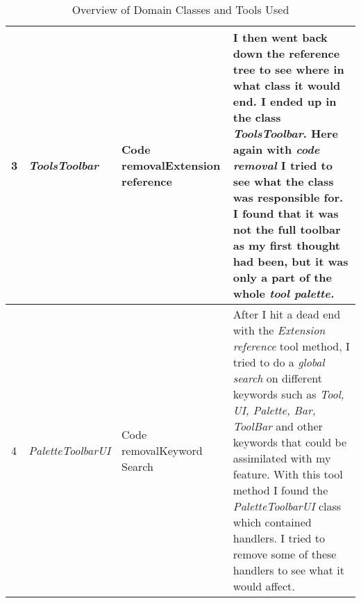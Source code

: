 \begin{table}[ht]
\begin{tabular}{|p{0.5cm}|p{3.5cm}|p{3.5cm}|p{8cm}|}
        3           & \textit{ToolsToolbar}       & Code removal\newline Extension reference                          & I then went back down the reference tree to see where in what class it would end. I ended up in the class \textit{ToolsToolbar}. Here again with \textit{code removal} I tried to see what the class was responsible for. I found that it was not the full toolbar as my first thought had been, but it was only a part of the whole \textit{tool palette.}                                                                                                                                     \\ \hline
        4           & \textit{PaletteToolbarUI}   & Code removal\newline Keyword Search                               & After I hit a dead end with the \textit{Extension reference} tool method, I tried to do a \textit{global search} on different keywords such as \textit{Tool, UI, Palette, Bar, ToolBar} and other keywords that could be assimilated with my feature. With this tool method I found the \textit{PaletteToolbarUI} class which contained handlers. I tried to remove some of these handlers to see what it would affect.                                                                         \\ \hline
    \end{tabular}
    \caption{Overview of Domain Classes and Tools Used}
    \label{table:domain-classes}
\end{table}


